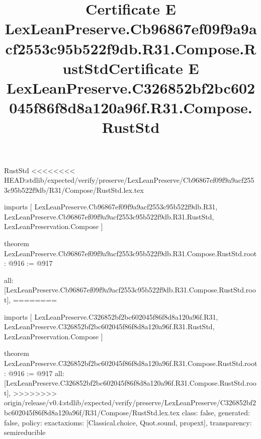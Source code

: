 \begin{lexlean}{RustStd}
<<<<<<<< HEAD:stdlib/expected/verify/preserve/LexLeanPreserve/Cb96867ef09f9a9acf2553c95b522f9db/R31/Compose/RustStd.lex.tex
\title{Certificate E LexLeanPreserve.Cb96867ef09f9a9acf2553c95b522f9db.R31.Compose.RustStd}
\begin{coremodule}
imports [
  LexLeanPreserve.Cb96867ef09f9a9acf2553c95b522f9db.R31,
  LexLeanPreserve.Cb96867ef09f9a9acf2553c95b522f9db.R31.RustStd,
  LexLeanPreservation.Compose
]

theorem LexLeanPreserve.Cb96867ef09f9a9acf2553c95b522f9db.R31.Compose.RustStd.root : @916 := @917 {
  all: [LexLeanPreserve.Cb96867ef09f9a9acf2553c95b522f9db.R31.Compose.RustStd.root],
========
\title{Certificate E LexLeanPreserve.C326852bf2bc602045f86f8d8a120a96f.R31.Compose.RustStd}
\begin{coremodule}
imports [
  LexLeanPreserve.C326852bf2bc602045f86f8d8a120a96f.R31,
  LexLeanPreserve.C326852bf2bc602045f86f8d8a120a96f.R31.RustStd,
  LexLeanPreservation.Compose
]

theorem LexLeanPreserve.C326852bf2bc602045f86f8d8a120a96f.R31.Compose.RustStd.root : @916 := @917 {
  all: [LexLeanPreserve.C326852bf2bc602045f86f8d8a120a96f.R31.Compose.RustStd.root],
>>>>>>>> origin/release/v0.4:stdlib/expected/verify/preserve/LexLeanPreserve/C326852bf2bc602045f86f8d8a120a96f/R31/Compose/RustStd.lex.tex
  class: false,
  generated: false,
  policy: exact{axioms: [Classical.choice, Quot.sound, propext]},
  transparency: semireducible
}


\end{coremodule}}
\end{coremodule}
\end{lexlean}
